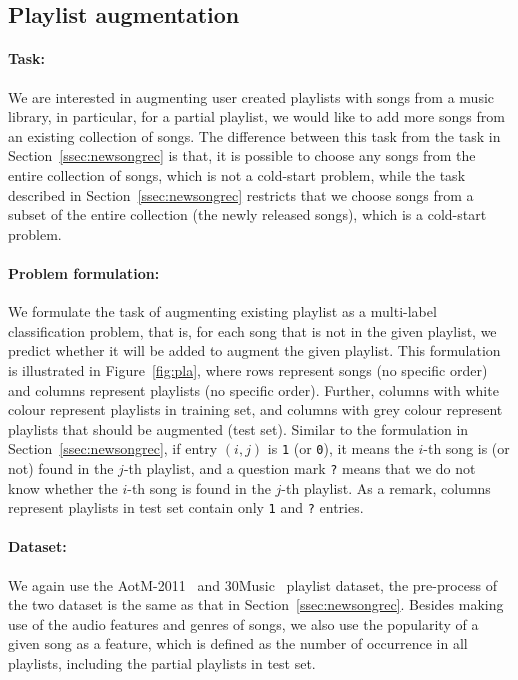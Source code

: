 \subsection{Playlist augmentation}
\label{ssec:pla}

\paragraph{Task:}
We are interested in augmenting user created playlists with songs from a music library,
in particular, for a partial playlist, we would like to add more songs from an existing collection of songs.
The difference between this task from the task in Section~\ref{ssec:newsongrec} is that,
it is possible to choose any songs from the entire collection of songs, which is not a cold-start problem,
while the task described in Section~\ref{ssec:newsongrec} restricts that 
we choose songs from a subset of the entire collection (the newly released songs), 
which is a cold-start problem.

\paragraph{Problem formulation:}
We formulate the task of augmenting existing playlist as a multi-label classification problem,
that is, for each song that is not in the given playlist, 
we predict whether it will be added to augment the given playlist.
This formulation is illustrated in Figure~\ref{fig:pla},
where rows represent songs (no specific order) and columns represent playlists (no specific order).
Further, columns with white colour represent playlists in training set, 
and columns with grey colour represent playlists that should be augmented (\ie test set).
Similar to the formulation in Section~\ref{ssec:newsongrec}, if entry $(i, j)$ is \texttt{1} (or \texttt{0}), 
it means the $i$-th song is (or not) found in the $j$-th playlist, 
and a question mark \texttt{?} means that we do not know whether the $i$-th song is found in the $j$-th playlist.
As a remark, columns represent playlists in test set contain only \texttt{1} and \texttt{?} entries.



\paragraph{Dataset:}
We again use the AotM-2011~\cite{mcfee2012hypergraph} and 30Music~\cite{30music2015} playlist dataset,
the pre-process of the two dataset is the same as that in Section~\ref{ssec:newsongrec}.
Besides making use of the audio features and genres of songs,
we also use the popularity of a given song as a feature, which is defined as the number of occurrence in all playlists,
including the partial playlists in test set.

